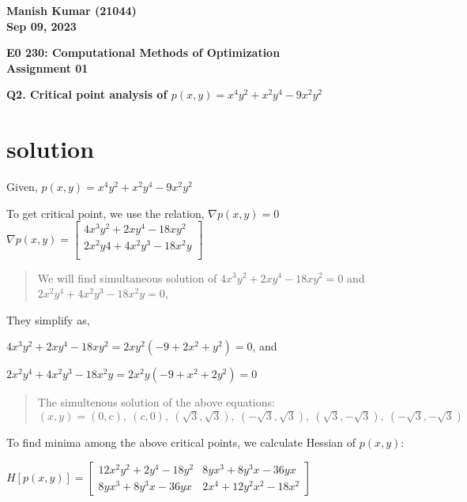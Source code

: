 \documentclass{article}%
\begin{document}
\begin{flushright}
\textbf{Manish Kumar (21044) \\
Sep 09, 2023}
\end{flushright}

\begin{center}
\textbf{E0 230: Computational Methods of Optimization \\
Assignment 01} \\
\end{center}

\textbf{Q2. Critical point analysis of $p(x,y)=x^4y^2+x^2y^4-9x^2y^2$}

\section*{solution}
Given, $p(x,y)=x^4y^2+x^2y^4-9x^2y^2$

To get critical point, we use the relation, $\nabla p(x,y)=0$\\

$\nabla p(x,y)=\begin{bmatrix}
                   4x^3y^2+2xy^4-18xy^2 \\
                   2x^2y4+4x^2y^3-18x^2y \\
               \end{bmatrix}$
\begin{quote}
We will find simultaneous solution of $4x^3y^2+2xy^4-18xy^2=0$ and $2x^2y^4+4x^2y^3-18x^2y=0$,
\end{quote}

They simplify as, 

$4x^3y^2+2xy^4-18xy^2=2 x y^2 (-9 + 2 x^2 + y^2)=0$, and

$2x^2y^4+4x^2y^3-18x^2y= 2 x^2 y (-9 + x^2 + 2 y^2)=0$


\begin{quote}
The simultenous solution of the above equations: $(x,y)=(0,c),\ (c,0),\ (\sqrt{3},\sqrt{3}),\ (-\sqrt{3},\sqrt{3}),\ (\sqrt{3},-\sqrt{3}),\ (-\sqrt{3},-\sqrt{3})$
\end{quote}

To find minima among the above critical points, we calculate Hessian of $p(x,y)$:

$H[p(x,y)]= \begin{bmatrix}
               12 x^2 y^2+2 y^4 - 18 y^2 & 8 y x^3 + 8 y^3 x - 36 y x\\
               8 y x^3 + 8 y^3 x - 36 y x & 2 x^4 + 12 y^2 x^2 - 18 x^2
             \end{bmatrix}
$
\end{document}
